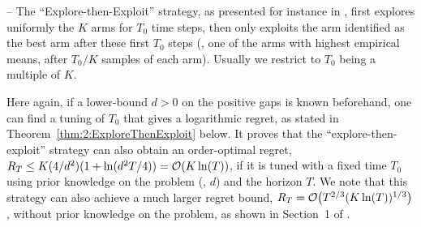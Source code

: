-- The ``\textcolor{deepgold}{Explore-then-Exploit}'' strategy, as presented for instance in \cite{Bubeck12}, first explores uniformly the $K$ arms for $T_0$ time steps, then only exploits the arm identified as the best arm after these first $T_0$ steps
(\ie, one of the arms with highest empirical means, after $T_0/K$ samples of each arm).
Usually we restrict to $T_0$ being a multiple of $K$.

Here again, if a lower-bound $d>0$ on the positive gaps is known beforehand, one can find a tuning of $T_0$ that gives a logarithmic regret, as stated in Theorem~\ref{thm:2:ExploreThenExploit} below.
It proves that the ``explore-then-exploit'' strategy can also obtain an order-optimal regret, $R_T \leq K (4/d^2) (1 + \ln(d^2 T / 4)) = \mathop{}\mathopen{}\mathcal{O}\mathopen{}\left(K \ln(T)\right)$, if it is tuned with a fixed time $T_0$ using prior knowledge on the problem (\ie, $d$) and the horizon $T$.
%
%
We note that this strategy can also achieve a much larger regret bound, $R_T = \mathop{}\mathopen{}\mathcal{O}\mathopen{}\left(T^{2/3} (K \ln(T))^{1/3}\right)$, without prior knowledge on the problem, as shown in Section~1 of \cite{Slivkins2019}.

